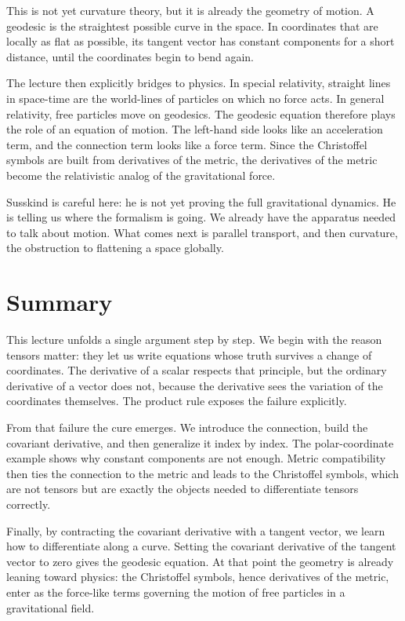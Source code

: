 This is not yet curvature theory, but it is already the geometry of motion. A geodesic is the straightest possible curve in the space. In coordinates that are locally as flat as possible, its tangent vector has constant components for a short distance, until the coordinates begin to bend again.

The lecture then explicitly bridges to physics. In special relativity, straight lines in space-time are the world-lines of particles on which no force acts. In general relativity, free particles move on geodesics. The geodesic equation therefore plays the role of an equation of motion. The left-hand side looks like an acceleration term, and the connection term looks like a force term. Since the Christoffel symbols are built from derivatives of the metric, the derivatives of the metric become the relativistic analog of the gravitational force.

Susskind is careful here: he is not yet proving the full gravitational dynamics. He is telling us where the formalism is going. We already have the apparatus needed to talk about motion. What comes next is parallel transport, and then curvature, the obstruction to flattening a space globally.

\section{Summary}

This lecture unfolds a single argument step by step. We begin with the reason tensors matter: they let us write equations whose truth survives a change of coordinates. The derivative of a scalar respects that principle, but the ordinary derivative of a vector does not, because the derivative sees the variation of the coordinates themselves. The product rule exposes the failure explicitly.

From that failure the cure emerges. We introduce the connection, build the covariant derivative, and then generalize it index by index. The polar-coordinate example shows why constant components are not enough. Metric compatibility then ties the connection to the metric and leads to the Christoffel symbols, which are not tensors but are exactly the objects needed to differentiate tensors correctly.

Finally, by contracting the covariant derivative with a tangent vector, we learn how to differentiate along a curve. Setting the covariant derivative of the tangent vector to zero gives the geodesic equation. At that point the geometry is already leaning toward physics: the Christoffel symbols, hence derivatives of the metric, enter as the force-like terms governing the motion of free particles in a gravitational field.
